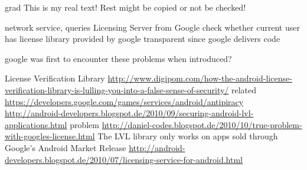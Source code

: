 grad%
This is my real text! Rest might be copied or not be checked!

%
network service, queries Licensing Server from Google
check whether current user has license
library provided by google
transparent since google delivers code

\cite{munteanLicense}
%


google was first to encounter these problems
when introduced?

License Verification Library\newline
\url{http://www.digipom.com/how-the-android-license-verification-library-is-lulling-you-into-a-false-sense-of-security/}\newline
related \url{https://developers.google.com/games/services/android/antipiracy}\newline
\url{http://android-developers.blogspot.de/2010/09/securing-android-lvl-applications.html}\newline
problem \url{http://daniel-codes.blogspot.de/2010/10/true-problem-with-googles-license.html}\newline
The LVL library only works on apps sold through Google's Android Market
Release \url{http://android-developers.blogspot.de/2010/07/licensing-service-for-android.html}
